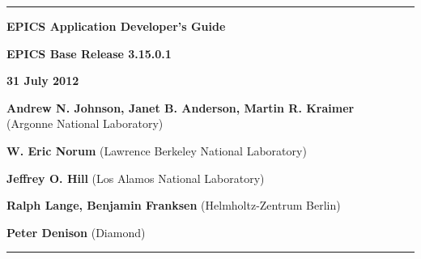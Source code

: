 \hrule

\vspace{1in}

\noindent \Huge \textbf{EPICS Application Developer's Guide}

\vspace{0.5in}

\noindent \Large \textbf{EPICS Base Release 3.15.0.1}

\noindent \textbf{31 July 2012}

\vspace{0.5in}

\noindent \normalsize \textbf{Andrew N. Johnson, Janet B. Anderson, Martin R. Kraimer}\\
(Argonne National Laboratory)

\noindent \textbf{W. Eric Norum} (Lawrence Berkeley National Laboratory)

\noindent \textbf{Jeffrey O. Hill} (Los Alamos National Laboratory)

\noindent \textbf{Ralph Lange, Benjamin Franksen} (Helmholtz-Zentrum Berlin)

\noindent \textbf{Peter Denison} (Diamond)

\vspace{1in}
\hrule
